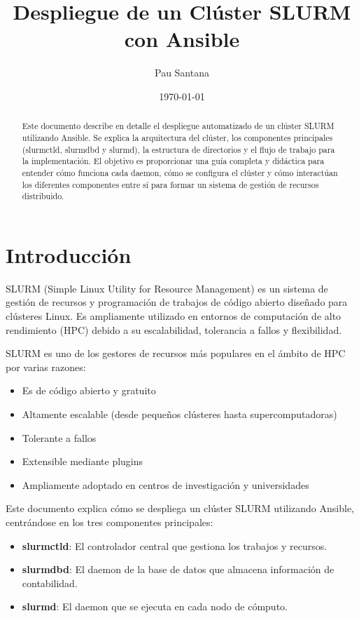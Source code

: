 \documentclass[12pt,a4paper]{article}
\title{\Huge\bfseries Despliegue de un Clúster SLURM con Ansible}
\author{\Large Pau Santana}
\date{\today}
\begin{document}
\maketitle

\begin{abstract}
\noindent Este documento describe en detalle el despliegue automatizado de un clúster SLURM utilizando Ansible. Se explica la arquitectura del clúster, los componentes principales (slurmctld, slurmdbd y slurmd), la estructura de directorios y el flujo de trabajo para la implementación. El objetivo es proporcionar una guía completa y didáctica para entender cómo funciona cada daemon, cómo se configura el clúster y cómo interactúan los diferentes componentes entre sí para formar un sistema de gestión de recursos distribuido.
\end{abstract}

\newpage
\tableofcontents
\newpage

\section{Introducción}
\newpage

SLURM (Simple Linux Utility for Resource Management) es un sistema de gestión de recursos y programación de trabajos de código abierto diseñado para clústeres Linux. Es ampliamente utilizado en entornos de computación de alto rendimiento (HPC) debido a su escalabilidad, tolerancia a fallos y flexibilidad.

\begin{infobox}
SLURM es uno de los gestores de recursos más populares en el ámbito de HPC por varias razones:
\begin{itemize}
    \item Es de código abierto y gratuito
    \item Altamente escalable (desde pequeños clústeres hasta supercomputadoras)
    \item Tolerante a fallos
    \item Extensible mediante plugins
    \item Ampliamente adoptado en centros de investigación y universidades
\end{itemize}
\end{infobox}

Este documento explica cómo se despliega un clúster SLURM utilizando Ansible, centrándose en los tres componentes principales:

\begin{itemize}[leftmargin=*]
    \item \textbf{slurmctld}: El controlador central que gestiona los trabajos y recursos.
    \item \textbf{slurmdbd}: El daemon de la base de datos que almacena información de contabilidad.
    \item \textbf{slurmd}: El daemon que se ejecuta en cada nodo de cómputo.
\end{itemize}
\end{document}
